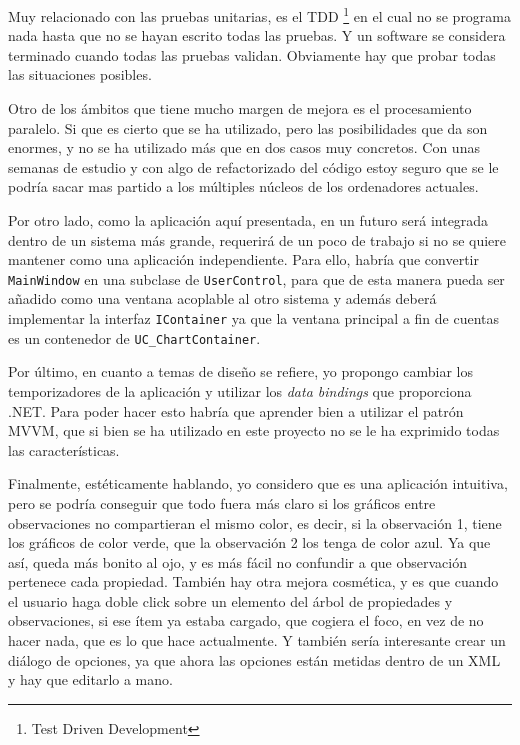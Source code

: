 Muy relacionado con las pruebas unitarias, es el TDD \footnote{Test Driven Development} en el cual no se programa
nada hasta que no se hayan escrito todas las pruebas. Y un software se considera terminado cuando todas las pruebas
validan. Obviamente hay que probar todas las situaciones posibles.

Otro de los \'ambitos que tiene mucho margen de mejora es el procesamiento paralelo. Si que es cierto que se ha
utilizado, pero las posibilidades que da son enormes, y no se ha utilizado m\'as que en dos casos
muy concretos. Con unas semanas de estudio y con algo de refactorizado del c\'odigo estoy seguro
que se le podr\'ia sacar mas partido a los m\'ultiples n\'ucleos de los ordenadores actuales.

Por otro lado, como la aplicaci\'on aqu\'i presentada, en un futuro ser\'a integrada dentro de un sistema m\'as grande,
requerir\'a de un poco de trabajo si no se quiere mantener como una aplicaci\'on independiente.
Para ello, habr\'ia que convertir \texttt{MainWindow} en una subclase de \texttt{UserControl}, para
que de esta manera pueda ser a\~nadido como una ventana acoplable al otro sistema y adem\'as deber\'a
implementar la interfaz \texttt{IContainer} ya que la ventana principal a fin de cuentas es un contenedor
de \texttt{UC\_ChartContainer}.

Por \'ultimo, en cuanto a temas de dise\~no se refiere, yo propongo cambiar los temporizadores de la
aplicaci\'on y utilizar los \emph{data bindings} que proporciona .NET. Para poder hacer esto
habr\'ia que aprender bien a utilizar el patr\'on MVVM, que si bien se ha utilizado en este proyecto
no se le ha exprimido todas las caracter\'isticas.

Finalmente, est\'eticamente hablando, yo considero que es una aplicaci\'on intuitiva, pero se podr\'ia conseguir
que todo fuera m\'as claro si los gr\'aficos entre observaciones no compartieran el mismo color,
es decir, si la observaci\'on 1, tiene los gr\'aficos de color verde, que la observaci\'on 2 los tenga de color azul.
Ya que as\'i, queda m\'as bonito al ojo, y es m\'as f\'acil no confundir a que observaci\'on pertenece cada propiedad.
Tambi\'en hay otra mejora cosm\'etica, y es que cuando el usuario haga doble click sobre un elemento del \'arbol
de propiedades y observaciones, si ese \'item ya estaba cargado, que cogiera el foco, en vez de no hacer nada, que 
es lo que hace actualmente. Y tambi\'en ser\'ia interesante crear un di\'alogo de opciones, ya que ahora las
opciones est\'an metidas dentro de un XML y hay que editarlo a mano.

